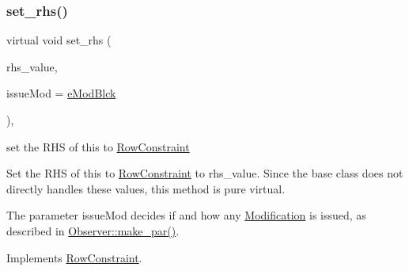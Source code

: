\subsubsection{\texorpdfstring{set\+\_\+rhs()}{set\_rhs()}}
{\footnotesize\ttfamily virtual void set\+\_\+rhs (\begin{DoxyParamCaption}\item[{\mbox{\hyperlink{class_s_m_spp__di__unipi__it_1_1_row_constraint_a34abd4b01d3a2024be5f6d13dd88779f}{c\+\_\+\+R\+H\+S\+Value}}}]{rhs\+\_\+value,  }\item[{\mbox{\hyperlink{group___modification___t_y_p_e_s_ga544246d8c462e9a2d817c2c30797968f}{c\+\_\+\+Mod\+Param}}}]{issue\+Mod = {\ttfamily \mbox{\hyperlink{group___modification___t_y_p_e_s_gga48fddcdd03a03f49b7e389ca1ed938d4a21b14b26b1c0093a0905f6fc010bad29}{e\+Mod\+Blck}}} }\end{DoxyParamCaption})\hspace{0.3cm}{\ttfamily [override]}, {\ttfamily [virtual]}}



set the R\+HS of this to \mbox{\hyperlink{class_s_m_spp__di__unipi__it_1_1_row_constraint}{Row\+Constraint}} 

Set the R\+HS of this to \mbox{\hyperlink{class_s_m_spp__di__unipi__it_1_1_row_constraint}{Row\+Constraint}} to rhs\+\_\+value. Since the base class does not directly handles these values, this method is pure virtual.

The parameter issue\+Mod decides if and how any \mbox{\hyperlink{class_s_m_spp__di__unipi__it_1_1_modification}{Modification}} is issued, as described in \mbox{\hyperlink{class_s_m_spp__di__unipi__it_1_1_observer_a2d499ae38e5e95cf66cd71da32b0694a}{Observer\+::make\+\_\+par()}}. 

Implements \mbox{\hyperlink{class_s_m_spp__di__unipi__it_1_1_row_constraint_a42d5ec40966a094c7fa805a5ea44337b}{Row\+Constraint}}.

\mbox{\label{class_s_m_spp__di__unipi__it_1_1_f_row_constraint_a216c7c4b025d1bc2e3b1a89dc2c1d46f}} 
